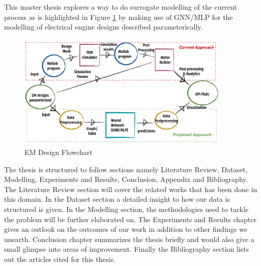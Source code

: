 \documentclass{report} %
\begin{document}

This master thesis explores a way to do surrogate modelling of the current process as is highlighted in Figure \ref{fig:EM Design Flowchart} by making use of GNN/MLP for the modelling of electrical engine designs described parameterically. \\
\begin{figure}[h]
    \centering
    \includegraphics[width=0.9\textwidth]{./ReportImages/EM_design_flowchart_v2.png} 
    \caption{EM Design Flowchart}
    \label{fig:EM Design Flowchart}
\end{figure}

The thesis is structured to follow sections namely Literature Review, Dataset, Modelling, Experiments and Results, Conclusion, Appendix and Bibliography.\\
The Literature Review section will cover the related works that has been done in this domain. In the Dataset section a detailed insight to how our data is structured is given.
In the Modelling section, the methodologies used to tackle the problem will be further elaborated on. The Experiments and Results chapter gives an outlook on the outcomes of our work in addition to other findings we unearth. 
Conclusion chapter summarizes the thesis briefly and would also give a small glimpse into areas of improvement. Finally the Bibliography section lists out the articles cited for this thesis.\\
\newpage 
\end{document}
